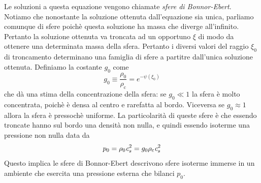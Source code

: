 Le soluzioni a questa equazione vengono chiamate \textit{sfere di Bonnor-Ebert}. Notiamo che nonostante la soluzione ottenuta dall'equazione sia unica, parliamo comunque di sfere poichè questa soluzione ha massa che diverge all'infinito. Pertanto la soluzione ottenuta va troncata ad un opportuno $\xi$ di modo da ottenere una determinata massa della sfera. Pertanto i diversi valori del raggio $\xi_0$ di troncamento determinano una famiglia di sfere a partitre dall'unica soluzione ottenuta. Definiamo la costante $g_0$ come
\begin{equation}
g_0 \equiv \frac{\rho_0}{\rho_\mathrm{c}} = e^{-\psi(\xi_0)}
\end{equation}
che dà una stima della concentrazione della sfera: se $g_0 \ll 1$ la sfera è molto concentrata, poichè è densa al centro e rarefatta al bordo. Viceversa se $g_0 \approx 1$ allora la sfera è pressochè uniforme. La particolarità di queste sfere è che essendo troncate hanno sul bordo una densità non nulla, e quindi essendo isoterme una pressione non nulla data da
\begin{equation}
p_0 = \rho_0 \textit{c}_{s}^2 = g_0 \rho_\mathrm{c}\textit{c}_{s}^2
\end{equation}
Questo implica le sfere di Bonnor-Ebert descrivono sfere isoterme immerse in un ambiente che esercita una pressione esterna che bilanci $p_0$. 

